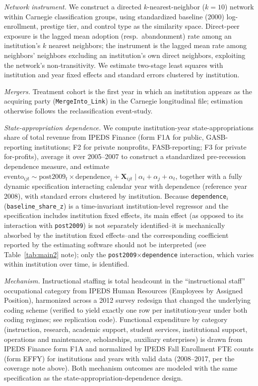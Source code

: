 \documentclass[11pt, letterpaper]{article}
\begin{document}
\emph{Network instrument.} We construct a directed $k$-nearest-neighbor ($k=10$) network within Carnegie classification groups, using standardized baseline (2000) log-enrollment, prestige tier, and control type as the similarity space. Direct-peer exposure is the lagged mean adoption (resp.\ abandonment) rate among an institution's $k$ nearest neighbors; the instrument is the lagged mean rate among neighbors' neighbors excluding an institution's own direct neighbors, exploiting the network's non-transitivity. We estimate two-stage least squares with institution and year fixed effects and standard errors clustered by institution.

\emph{Mergers.} Treatment cohort is the first year in which an institution appears as the acquiring party (\texttt{MergeInto\_Link}) in the Carnegie longitudinal file; estimation otherwise follows the reclassification event-study.

\emph{State-appropriation dependence.} We compute institution-year state-appropriations share of total revenue from IPEDS Finance (form F1A for public, GASB-reporting institutions; F2 for private nonprofits, FASB-reporting; F3 for private for-profits), average it over 2005--2007 to construct a standardized pre-recession dependence measure, and estimate $\mathrm{evento}_{ijt} \sim \mathrm{post}2009_t \times \mathrm{dependence}_i + \mathbf{X}_{ijt} \mid \alpha_i + \alpha_j + \alpha_t$, together with a fully dynamic specification interacting calendar year with dependence (reference year 2008), with standard errors clustered by institution. Because \texttt{dependence}$_i$ (\texttt{baseline\_share\_z}) is a time-invariant institution-level regressor and the specification includes institution fixed effects, its main effect (as opposed to its interaction with \texttt{post2009}) is not separately identified--it is mechanically absorbed by the institution fixed effects--and the corresponding coefficient reported by the estimating software should not be interpreted (see Table~\ref{tab:main2} note); only the \texttt{post2009}$\times$\texttt{dependence} interaction, which varies within institution over time, is identified.

\emph{Mechanism.} Instructional staffing is total headcount in the ``instructional staff'' occupational category from IPEDS Human Resources (Employees by Assigned Position), harmonized across a 2012 survey redesign that changed the underlying coding scheme (verified to yield exactly one row per institution-year under both coding regimes; see replication code). Functional expenditure by category (instruction, research, academic support, student services, institutional support, operations and maintenance, scholarships, auxiliary enterprises) is drawn from IPEDS Finance form F1A and normalized by IPEDS Fall Enrollment FTE counts (form EFFY) for institutions and years with valid data (2008--2017, per the coverage note above). Both mechanism outcomes are modeled with the same specification as the state-appropriation-dependence design.
\end{document}

